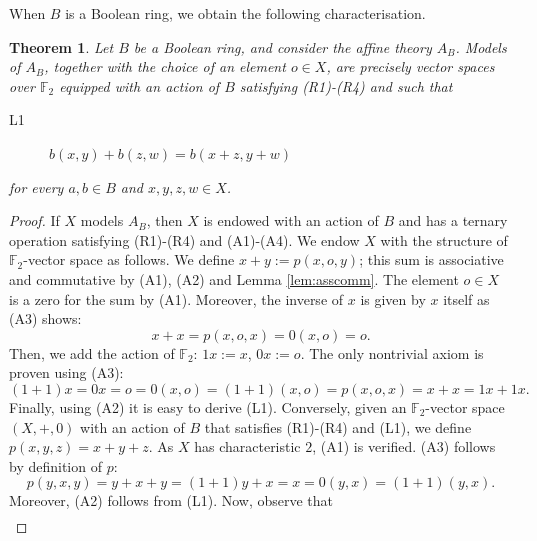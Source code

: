 \documentclass{amsart}
\numberwithin{equation}{section}
\theoremstyle{plain}
\newtheorem{theorem}{Theorem}[section]
\theoremstyle{definition}
\begin{document}
When $B$ is a Boolean ring, we obtain the following characterisation. 
\begin{theorem}
  \label{thm:new1}
  Let $B$ be a Boolean ring, and consider the affine theory $A_B$. 
  Models of $A_B$, together with the choice of an element $o \in X$, are precisely vector spaces over $\mathbb{F}_2$ equipped with an action of $B$ satisfying \emph{(R1)-(R4)} and such that 
  \begin{description}
  \item[L1] $b(x,y) + b(z,w) = b(x+z,y+w)$
  \end{description} 
  for every $a,b \in B$ and $x,y,z,w \in X$.
\end{theorem}
\begin{proof}
  If $X$ models $A_B$, then $X$ is endowed with an action of $B$ and has a ternary operation satisfying (R1)-(R4) and (A1)-(A4).  
  We endow $X$ with the structure of $\mathbb{F}_2$-vector space as follows.
  We define $x+y:=p(x,o,y)$; 
  this sum is associative and commutative by (A1), (A2) and Lemma \ref{lem:asscomm}. 
  The element $o \in X$ is a zero for the sum by (A1). 
  Moreover, the inverse of $x$ is given by $x$ itself as (A3) shows: 
  \begin{equation*}
    x+x = p(x,o,x) = 0(x,o) =o\text{.}
  \end{equation*}
  Then, we add the action of $\mathbb{F}_2$: $1x:=x$, $0x:=o$. 
  The only nontrivial axiom is proven using (A3): 
  \begin{equation*}
    (1+1)x=0x=o=0(x,o)=(1+1)(x,o)=p(x,o,x)=x+x=1x+1x \text{.}
  \end{equation*}
  Finally, using (A2) it is easy to derive (L1). 
  Conversely, given an $\mathbb{F}_2$-vector space $(X,+,0)$ with an action of $B$ that satisfies (R1)-(R4) and (L1), we define $p(x,y,z)=x+y+z$. 
  As $X$ has characteristic $2$, (A1) is verified. 
  (A3) follows by definition of $p$: 
  \begin{equation*}
    p(y,x,y)=y+x+y=(1+1)y+x=x=0(y,x)=(1+1)(y,x) \text{.}
  \end{equation*}
  Moreover, (A2) follows from (L1). 
  Now, observe that 
  \begin{align*}

\end{align*}
\end{proof}
\end{document}
